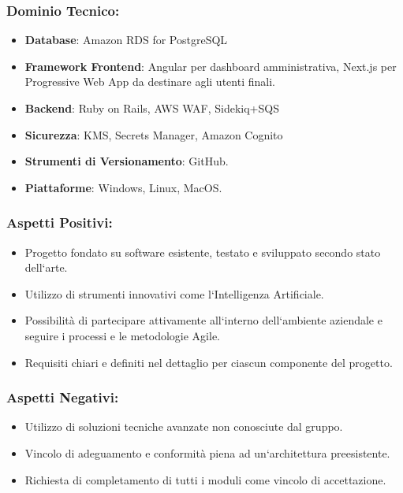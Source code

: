 \documentclass[a4paper,12pt]{article}
\begin{document}
\subsubsection*{Dominio Tecnico:}
\begin{itemize}
    \item \textbf{Database}: Amazon RDS for PostgreSQL
    \item \textbf{Framework Frontend}: Angular per dashboard amministrativa, Next.js per Progressive Web App da destinare agli utenti finali.
    \item \textbf{Backend}: Ruby on Rails, AWS WAF, Sidekiq+SQS
    \item \textbf{Sicurezza}: KMS, Secrets Manager, Amazon Cognito
    \item \textbf{Strumenti di Versionamento}: GitHub.
    \item \textbf{Piattaforme}: Windows, Linux, MacOS.
\end{itemize}
\subsubsection*{Aspetti Positivi:}
\begin{itemize}
    \item Progetto fondato su software esistente, testato e sviluppato secondo stato
          dell`arte.
    \item Utilizzo di strumenti innovativi come l`Intelligenza Artificiale.
    \item Possibilità di partecipare attivamente all`interno dell`ambiente aziendale e
          seguire i processi e le metodologie Agile.
    \item Requisiti chiari e definiti nel dettaglio per ciascun componente del progetto.
\end{itemize}

\subsubsection*{Aspetti Negativi:}
\begin{itemize}
    \item Utilizzo di soluzioni tecniche avanzate non conosciute dal gruppo.
    \item Vincolo di adeguamento e conformità piena ad un`architettura preesistente.
    \item Richiesta di completamento di tutti i moduli come vincolo di accettazione.
\end{itemize}
\end{document}
